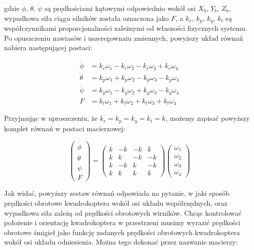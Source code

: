 gdzie $\dot{\phi}$, $\dot{\theta}$, $\dot{\psi}$ są prędkościami kątowymi odpowiednio wokół osi $X_b$, $Y_b$, $Z_b$, wypadkowa siła ciągu silników została oznaczona jako $F$, a $k_r$, $k_p$, $k_y$, $k_t$ są współczynnikami proporcjonalności zależnymi od własności fizycznych systemu. Po opuszczeniu nawiasów i uszeregownaiu zmiennych, powyższy układ równań nabiera następującej postaci:

\begin{equation}
\begin{aligned}
	\dot{\phi} &= k_r\omega_1 - k_r\omega_2 - k_r\omega_3 + k_r\omega_4 \\
	\dot{\theta} &= k_p\omega_1 + k_p\omega_2 - k_p\omega_3 - k_p\omega_4 \\
	\dot{\psi} &= k_y\omega_1 - k_y\omega_2 + k_y\omega_3 - k_y\omega_4 \\
	F &= k_t\omega_1 + k_t\omega_2 + k_t\omega_3 + k_t\omega_4
\end{aligned}
\end{equation}



Przyjmując w uproszczeniu, że $k_r = k_p = k_y = k_t = k$, możemy zapisać powyższy komplet równań w postaci macierzowej:

\begin{equation}
	\label{eq:omega_as_argument}
	\begin{pmatrix}
		\dot{\phi} \\
		\dot{\theta} \\
		\dot{\psi} \\
		F
	\end{pmatrix} = 
	\begin{pmatrix}
		k & -k & -k & k \\
		k & k & -k & -k \\
		k & -k & k & -k \\
		k & k & k & k
	\end{pmatrix}
	\begin{pmatrix}
		\omega_1 \\
		\omega_2 \\
		\omega_3 \\
		\omega_4
	\end{pmatrix}
\end{equation}

Jak widać, powyższy zestaw równań odpowiada na pytanie, w jaki sposób prędkości obrotowe kwadrokoptera wokół osi układu współrzędnych, oraz wypadkowa siła zależą od prędkości obrotowych wirników. Chcąc kontrolować położenie i orientację kwadrokoptera w przestrzeni musimy wyrazić prędkości obrotowe śmigieł jako funkcję zadanych prędkości obrotowych kwadrokoptera wokół osi układu odniesienia. Można tego dokonać przez nazwanie macierzy:


